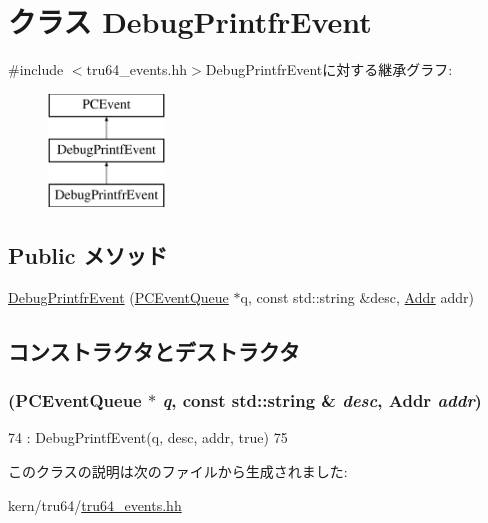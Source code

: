 \hypertarget{classDebugPrintfrEvent}{
\section{クラス DebugPrintfrEvent}
\label{classDebugPrintfrEvent}
}


{\ttfamily \#include $<$tru64\_\-events.hh$>$}DebugPrintfrEventに対する継承グラフ:\begin{figure}[H]
\begin{center}
\leavevmode
\includegraphics[height=3cm]{classDebugPrintfrEvent}
\end{center}
\end{figure}
\subsection*{Public メソッド}
\begin{DoxyCompactItemize}
\item 
\hyperlink{classDebugPrintfrEvent_aa213324a3070882d31a83c62dd3cc685}{DebugPrintfrEvent} (\hyperlink{classPCEventQueue}{PCEventQueue} $\ast$q, const std::string \&desc, \hyperlink{base_2types_8hh_af1bb03d6a4ee096394a6749f0a169232}{Addr} addr)
\end{DoxyCompactItemize}


\subsection{コンストラクタとデストラクタ}
\hypertarget{classDebugPrintfrEvent_aa213324a3070882d31a83c62dd3cc685}{
\subsubsection[{DebugPrintfrEvent}]{ ({\bf PCEventQueue} $\ast$ {\em q}, \/  const std::string \& {\em desc}, \/  {\bf Addr} {\em addr})}}
\label{classDebugPrintfrEvent_aa213324a3070882d31a83c62dd3cc685}



\begin{DoxyCode}
74         : DebugPrintfEvent(q, desc, addr, true)
75     {}
\end{DoxyCode}


このクラスの説明は次のファイルから生成されました:\begin{DoxyCompactItemize}
\item 
kern/tru64/\hyperlink{tru64__events_8hh}{tru64\_\-events.hh}\end{DoxyCompactItemize}
